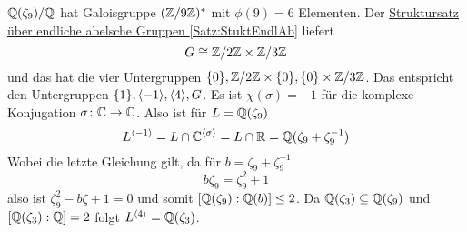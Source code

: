 \begin{Bsp}
    $\mathbb{Q}(\zeta_9)/\mathbb{Q}$ hat Galoisgruppe $(\mathbb{Z}/9\mathbb{Z})^*$ mit $\phi(9)=6$ Elementen. Der \hyperref[Satz:StuktEndlAb]{Struktursatz über endliche abelsche Gruppen \ref{Satz:StuktEndlAb}} liefert $$G\cong \mathbb{Z}/2\mathbb{Z}\times \mathbb{Z}/3\mathbb{Z}$$ und das hat die vier Untergruppen $\{0\},\mathbb{Z}/2\mathbb{Z}\times\{0\}, \{0\}\times\mathbb{Z}/3\mathbb{Z}$.
    Das entspricht den Untergruppen $\{1\}, \langle-1\rangle, \langle 4\rangle,G$.
    Es ist $\chi(\sigma)=-1$ für die komplexe Konjugation $\sigma\colon\mathbb{C}\to\mathbb{C}$. Also ist für $L=\mathbb{Q}(\zeta_9)$
    $$L^{\langle -1\rangle}=L\cap \mathbb{C}^{\langle \sigma\rangle}=L\cap\mathbb{R}=\mathbb{Q}(\zeta_9+\zeta_9^{-1})$$
    Wobei die letzte Gleichung gilt, da für $b=\zeta_9+\zeta_9^{-1}$
    $$b\zeta_9=\zeta_9^2+1$$ also ist $\zeta_9^2-b\zeta+1=0$ und somit $[\mathbb{Q}(\zeta_9):\mathbb{Q}(b)]\leq 2$.
    Da $\mathbb{Q}(\zeta_3)\subseteq \mathbb{Q}(\zeta_9)$ und $[\mathbb{Q}(\zeta_3):\mathbb{Q}]=2$ folgt $L^{\langle 4\rangle}=\mathbb{Q}(\zeta_3)$.
\end{Bsp}
